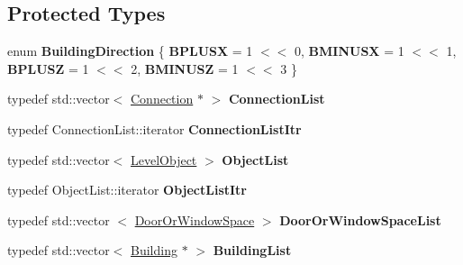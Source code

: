 \subsection*{\-Protected \-Types}
\begin{DoxyCompactItemize}
\item 
enum {\bfseries \-Building\-Direction} \{ {\bfseries \-B\-P\-L\-U\-S\-X} =  1 $<$$<$ 0, 
{\bfseries \-B\-M\-I\-N\-U\-S\-X} =  1 $<$$<$ 1, 
{\bfseries \-B\-P\-L\-U\-S\-Z} =  1 $<$$<$ 2, 
{\bfseries \-B\-M\-I\-N\-U\-S\-Z} =  1 $<$$<$ 3
 \}
\item 
\hypertarget{classLevel_a67a03fd7187682a20e7bcdf1536a7577}{
typedef std\-::vector$<$ \hyperlink{classLevel_1_1Connection}{\-Connection} $\ast$ $>$ {\bfseries \-Connection\-List}}
\label{d2/d9d/classLevel_a67a03fd7187682a20e7bcdf1536a7577}

\item 
\hypertarget{classLevel_a62d34b376916a91eafe88e6a59186abe}{
typedef \-Connection\-List\-::iterator {\bfseries \-Connection\-List\-Itr}}
\label{d2/d9d/classLevel_a62d34b376916a91eafe88e6a59186abe}

\item 
\hypertarget{classLevel_aa7e01756ef86c11c1edf0eb4bd3fd1e3}{
typedef std\-::vector$<$ \hyperlink{structLevel_1_1LevelObject}{\-Level\-Object} $>$ {\bfseries \-Object\-List}}
\label{d2/d9d/classLevel_aa7e01756ef86c11c1edf0eb4bd3fd1e3}

\item 
\hypertarget{classLevel_a8672f3d18ab87fdc2b4273872a465524}{
typedef \-Object\-List\-::iterator {\bfseries \-Object\-List\-Itr}}
\label{d2/d9d/classLevel_a8672f3d18ab87fdc2b4273872a465524}

\item 
\hypertarget{classLevel_a1701cb3b7d371ff7b4014788e0ab23f8}{
typedef std\-::vector\*
$<$ \hyperlink{structLevel_1_1DoorOrWindowSpace}{\-Door\-Or\-Window\-Space} $>$ {\bfseries \-Door\-Or\-Window\-Space\-List}}
\label{d2/d9d/classLevel_a1701cb3b7d371ff7b4014788e0ab23f8}

\item 
\hypertarget{classLevel_a9fd21b65f5bc6d257eec438e0a2f3bed}{
typedef std\-::vector$<$ \hyperlink{structLevel_1_1Building}{\-Building} $\ast$ $>$ {\bfseries \-Building\-List}}
\label{d2/d9d/classLevel_a9fd21b65f5bc6d257eec438e0a2f3bed}

\end{DoxyCompactItemize}

